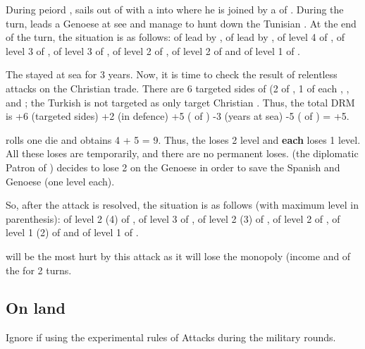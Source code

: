 \begin{exemple}
  During peiord ,  sails out of
  \villeAlger with a \corsaire\faceplus into  where he is joined
  by a \corsaire\facemoins of \paysTunisie. During the turn,  leads a Genoese \FLEET\facemoins at see and manage to hunt down the
  Tunisian \corsaire. At the end of the turn, the situation is as follows:
  \corsaire\faceplus of \paysAlgerie lead by ,
  \FLEET\facemoins of \paysGenes lead by ,
  \TradeFLEET\faceplus of level 4 of \FRA, \TradeFLEET\facemoins of level 3 of
  \paysHollande, \TradeFLEET\facemoins of level 3 of \paysGenes,
  \TradeFLEET\facemoins of level 2 of \SPA, \TradeFLEET\facemoins of level 2
  of \VEN and \TradeFLEET\facemoins of level 1 of \TUR.

  The \corsaire stayed at sea for 3 years. Now, it is time to check the result
  of  relentless attacks on the Christian trade. There are 6
  targeted sides of \TradeFLEET (2 of \FRA, 1 of each \paysHollande,
  \paysGenes, \HIS and \VEN; the Turkish \TradeFLEET is not targeted as
  \Barbaresques only target Christian \TradeFLEET. Thus, the total DRM is +6
  (targeted sides) +2 (\TradeFLEET\facemoins in defence) +5 (
  of ) -3 (years at sea) -5 ( of
  ) = +5.

  \TUR rolls one die and obtains 4 + 5 = 9. Thus, the \TradeFLEET\faceplus
  loses 2 level and \textbf{each} \TradeFLEET\facemoins loses 1 level. All
  these loses are temporarily, and there are no permanent loses. \HIS (the
  diplomatic Patron of \paysGenes) decides to lose 2 \NGD on the Genoese
  \FLEET in order to save the Spanish and Genoese \TradeFLEET (one level
  each).

  So, after the attack is resolved, the situation is as follows (with maximum
  level in parenthesis): \TradeFLEET\facemoins of level 2 (4) of \FRA,
  \TradeFLEET\facemoins of level 3 of \paysGenes, \TradeFLEET\facemoins of
  level 2 (3) of \paysHollande, \TradeFLEET\facemoins of level 2 of \HIS,
  \TradeFLEET\facemoins of level 1 (2) of \VEN and \TradeFLEET\facemoins of
  level 1 of \TUR.

  \FRA will be the most hurt by this attack as it will lose the monopoly
  (income and \VPs of the \STZ for 2 turns.
\end{exemple}

\subsection{On land}
\begin{designnote}
  Ignore if using the experimental rules of Attacks during the military
  rounds.
\end{designnote}

